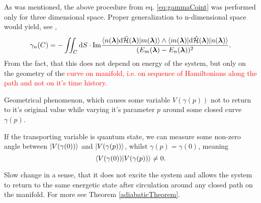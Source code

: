 As was mentioned, the above procedure from eq. \ref{eq:gammaCoint} was performed only for three dimensional space. Proper generalization to n-dimensional space would yield, see \citep{berry1984},
\begin{equation}
    \gamma_n(C) = -\iint_C \mathrm{d} S \cdot\textrm{Im} \frac{
            \braket{n({\bm\lambda})\mathrm{d} \hat{\mathcal{H}}({\bm\lambda}) |m({\bm\lambda})}\wedge \braket{m({\bm\lambda})|\mathrm{d}\hat{\mathcal{H}}({\bm\lambda})|n({\bm\lambda})}    
             }{
(E_m({\bm\lambda})-E_n({\bm\lambda}))^2
             }.
\end{equation}
From the fact, that this does not depend on energy of the system, but only on the geometry of the \textcolor{red}{curve on manifold, i.e. on sequence of Hamiltonians along the path and not on it's time history.}


\begin{definition}[Anholonomy]
    Geometrical phenomenon, which causes some variable $V(\gamma(p))$ not to return to it's original value while varying it's parameter $p$ around some closed curve $\gamma(p)$. 
\end{definition}
If the transporting variable is quantum state, we can measure some non-zero angle between $\ket{V(\gamma(0))}$ and $\ket{V(\gamma(p))}$, whilst $\gamma(p)=\gamma(0)$, meaning
$$\braket{V(\gamma(0))|V(\gamma(p))}\neq 0.$$

\begin{definition}[Adibaticity]
    Slow change in a sense, that it does not excite the system and allows the system to return to the same energetic state after circulation around any closed path on the manifold. For more see Theorem \ref{adiabaticTheorem}.
\end{definition}




